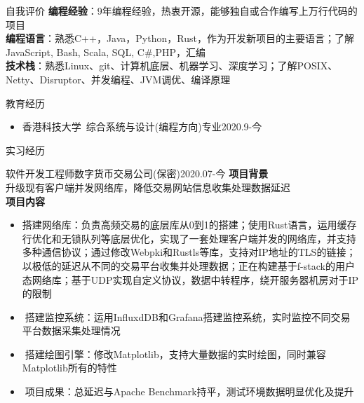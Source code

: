 \documentclass[UTF8]{resume}
\begin{document}
\begin{rSection}{自我评价}
    \textbf{编程经验}：9年编程经验，热衷开源，能够独自或合作编写上万行代码的项目\\
    \textbf{编程语言}：熟悉C++，Java，Python，Rust，作为开发新项目的主要语言；了解JavaScript, Bash, Scala, SQL, C\#,PHP，汇编\\
    \textbf{技术栈}：熟悉Linux、git、计算机底层、机器学习、深度学习；了解POSIX、Netty、Disruptor、并发编程、JVM调优、编译原理\\
\end{rSection}

\begin{rSection}{教育经历}
    \begin{itemize}
        \item 香港科技大学~综合系统与设计(编程方向)专业\hfill 2020.9-今
    \end{itemize}
\end{rSection}

\begin{rSection}{实习经历}
    \begin{rExperience}{软件开发工程师}{数字货币交易公司(保密)}{2020.07-今}
        \textbf{项目背景}\\
        升级现有客户端并发网络库，降低交易网站信息收集处理数据延迟\\
        \textbf{项目内容}
        \begin{itemize}
            \itemsep -0.5em \vspace{-0.5em}
            \item 搭建网络库：负责高频交易的底层库从0到1的搭建；使用Rust语言，运用缓存行优化和无锁队列等底层优化，实现了一套处理客户端并发的网络库，并支持多种通信协议；通过修改Webpki和Rustls等库，支持对IP地址的TLS的链接；以极低的延迟从不同的交易平台收集并处理数据；正在构建基于f-stack的用户态网络库；基于UDP实现自定义协议，数据中转程序，绕开服务器机房对于IP的限制
            \item搭建监控系统：运用InfluxdDB和Grafana搭建监控系统，实时监控不同交易平台数据采集处理情况
            \item搭建绘图引擎：修改Matplotlib，支持大量数据的实时绘图，同时兼容Matplotlib所有的特性
            \item项目成果：总延迟与Apache Benchmark持平，测试环境数据明显优化及提升
        \end{itemize}
    \end{rExperience}
\end{rSection}
\end{document}
